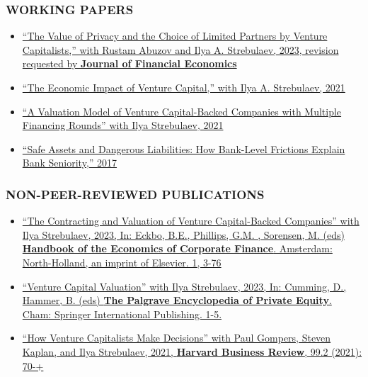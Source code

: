 \documentclass[11pt]{article}
\begin{document}
\subsubsection*{WORKING PAPERS}
\begin{itemize}[leftmargin=0pt, labelwidth=0cm, ]
    \item \href{https://papers.ssrn.com/sol3/papers.cfm?abstract_id=4235337}{%
        ``The Value of Privacy and the Choice of Limited Partners by Venture Capitalists,'' 
        with Rustam Abuzov and Ilya A. Strebulaev, 
        2023, revision requested by \textbf{Journal of Financial Economics}}

    \item \href{https://papers.ssrn.com/sol3/papers.cfm?abstract_id=2681841}{%
        ``The Economic Impact of Venture Capital,'' 
        with Ilya A. Strebulaev, 
        2021}

    \item \href{https://papers.ssrn.com/sol3/papers.cfm?abstract_id=3725240}{%
        ``A Valuation Model of Venture Capital-Backed Companies with Multiple Financing Rounds'' 
        with Ilya Strebulaev, 
        2021}

    \item \href{https://papers.ssrn.com/sol3/papers.cfm?abstract_id=2526574}{%
        ``Safe Assets and Dangerous Liabilities: How Bank-Level Frictions Explain Bank Seniority,'' 
        2017}
\end{itemize}

\subsubsection*{NON-PEER-REVIEWED PUBLICATIONS}
\begin{itemize}[leftmargin=0pt, labelwidth=0cm, ]
    \item \href{https://papers.ssrn.com/sol3/papers.cfm?abstract_id=4038538}{%
        ``The Contracting and Valuation of Venture Capital-Backed Companies'' 
        with Ilya Strebulaev, 
        2023, In: Eckbo, B.E., Phillips, G.M. , Sorensen, M. (eds) \textbf{Handbook of the Economics of Corporate Finance}. Amsterdam: North-Holland, an imprint of Elsevier. 1, 3-76}

    \item \href{https://papers.ssrn.com/sol3/papers.cfm?abstract_id=4038538}{%
        ``Venture Capital Valuation'' 
        with Ilya Strebulaev, 
        2023, In: Cumming, D., Hammer, B. (eds) \textbf{The Palgrave Encyclopedia of Private Equity}. Cham: Springer International Publishing. 1-5.}

    \item \href{https://papers.ssrn.com/sol3/papers.cfm?abstract_id=2801385}{%
        ``How Venture Capitalists Make Decisions'' 
        with Paul Gompers, Steven Kaplan, and Ilya Strebulaev, 
        2021, \textbf{Harvard Business Review}, 99.2 (2021): 70-+}
\end{itemize}
\end{document}
